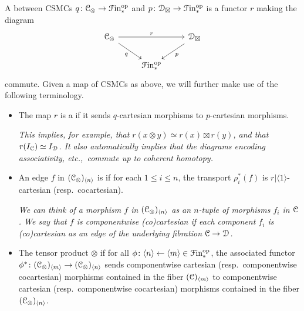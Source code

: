 \documentclass[main.tex]{subfiles}
\begin{document}
\begin{definition}
  \label{def:terminology_about_csmcs}
  A  between CSMCs $q\colon \mathcal{C}_{\otimes} \to \mathcal{F}\mathrm{in}_{*}^{\mathrm{op}}$ and $p\colon \mathcal{D}_{\boxtimes} \to \mathcal{F}\mathrm{in}_{*}^{\mathrm{op}}$ is a functor $r$ making the diagram
  \begin{equation*}
    \begin{tikzcd}
      \category{C}_{\otimes}
      \arrow[rr, "r"]
      \arrow[dr, swap, "q"]
      && \category{D}_{\boxtimes}
      \arrow[dl, "p"]
      \\
      & \Finp\op
    \end{tikzcd}
  \end{equation*}
  commute. Given a map of CSMCs as above, we will further make use of the following terminology.
  \begin{itemize}
    \item The map $r$ is a  if it sends $q$-cartesian morphisms to $p$-cartesian morphisms.

      \textit{This implies, for example, that $r(x \otimes y) \simeq r(x) \boxtimes r(y)$, and that $r(I_{\mathcal{C}}) \simeq I_{\mathcal{D}}$. It also automatically implies that the diagrams encoding associativity, etc.,\ commute up to coherent homotopy.}

    \item An edge $f$ in $(\mathcal{C}_{\otimes})_{\langle n \rangle}$ is  if for each $1 \leq i \leq n$, the transport $\rho_{i}^{*}(f)$ is $r|\langle 1 \rangle$-cartesian (resp.\ cocartesian).

      \textit{We can think of a morphism $f$ in $(\mathcal{C}_{\otimes})_{\langle n \rangle}$ as an $n$-tuple of morphisms $f_{i}$ in $\mathcal{C}$. We say that $f$ is componentwise (co)cartesian if each component $f_{i}$ is (co)cartesian as an edge of the underlying fibration $\mathcal{C} \to \mathcal{D}$.}

    \item The tensor product $\otimes$  if for all $\phi\colon \langle n \rangle \leftarrow \langle m \rangle \in \mathcal{F}\mathrm{in}_{*}^{\mathrm{op}}$, the associated functor $\phi^{*}\colon (\mathcal{C}_{\otimes})_{\langle m \rangle} \to (\mathcal{C}_{\otimes})_{\langle n \rangle}$ sends componentwise cartesian (resp.\ componentwise cocartesian) morphisms contained in the fiber $(\mathcal{C})_{\langle m \rangle}$ to componentwise cartesian (resp.\ componentwise cocartesian) morphisms contained in the fiber $(\mathcal{C}_{\otimes})_{\langle n \rangle}$.


\end{itemize}
\end{definition}
\end{document}
